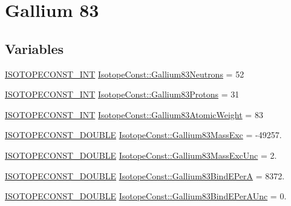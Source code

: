 \hypertarget{group___isotope_const-_gallium-_ga83}{}\section{Gallium 83}
\label{group___isotope_const-_gallium-_ga83}
\subsection*{Variables}
\begin{DoxyCompactItemize}
\item 
\mbox{\hyperlink{group___isotope_const-_macros_ga5f18360b3e99483a35c32d789e62621c}{I\+S\+O\+T\+O\+P\+E\+C\+O\+N\+S\+T\+\_\+\+I\+NT}} \mbox{\hyperlink{group___isotope_const-_gallium-_ga83_ga696f2ad19556b86b7cd582b1426db082}{Isotope\+Const\+::\+Gallium83\+Neutrons}} = 52
\item 
\mbox{\hyperlink{group___isotope_const-_macros_ga5f18360b3e99483a35c32d789e62621c}{I\+S\+O\+T\+O\+P\+E\+C\+O\+N\+S\+T\+\_\+\+I\+NT}} \mbox{\hyperlink{group___isotope_const-_gallium-_ga83_ga320ede1507cb8974cc3517ce604dbc89}{Isotope\+Const\+::\+Gallium83\+Protons}} = 31
\item 
\mbox{\hyperlink{group___isotope_const-_macros_ga5f18360b3e99483a35c32d789e62621c}{I\+S\+O\+T\+O\+P\+E\+C\+O\+N\+S\+T\+\_\+\+I\+NT}} \mbox{\hyperlink{group___isotope_const-_gallium-_ga83_gadae8c0547a0573df6a41caf8f7a9fee8}{Isotope\+Const\+::\+Gallium83\+Atomic\+Weight}} = 83
\item 
\mbox{\hyperlink{group___isotope_const-_macros_ga8f45a7272ce02c0b4c65c44636ed719a}{I\+S\+O\+T\+O\+P\+E\+C\+O\+N\+S\+T\+\_\+\+D\+O\+U\+B\+LE}} \mbox{\hyperlink{group___isotope_const-_gallium-_ga83_gabb8a637eeac85a47fb3b9ad7ef322934}{Isotope\+Const\+::\+Gallium83\+Mass\+Exc}} = -\/49257.
\item 
\mbox{\hyperlink{group___isotope_const-_macros_ga8f45a7272ce02c0b4c65c44636ed719a}{I\+S\+O\+T\+O\+P\+E\+C\+O\+N\+S\+T\+\_\+\+D\+O\+U\+B\+LE}} \mbox{\hyperlink{group___isotope_const-_gallium-_ga83_ga59e770236fc9253fd94c1864504096cb}{Isotope\+Const\+::\+Gallium83\+Mass\+Exc\+Unc}} = 2.
\item 
\mbox{\hyperlink{group___isotope_const-_macros_ga8f45a7272ce02c0b4c65c44636ed719a}{I\+S\+O\+T\+O\+P\+E\+C\+O\+N\+S\+T\+\_\+\+D\+O\+U\+B\+LE}} \mbox{\hyperlink{group___isotope_const-_gallium-_ga83_ga865e16badc79553e20939d57bc2a23bc}{Isotope\+Const\+::\+Gallium83\+Bind\+E\+PerA}} = 8372.
\item 
\mbox{\hyperlink{group___isotope_const-_macros_ga8f45a7272ce02c0b4c65c44636ed719a}{I\+S\+O\+T\+O\+P\+E\+C\+O\+N\+S\+T\+\_\+\+D\+O\+U\+B\+LE}} \mbox{\hyperlink{group___isotope_const-_gallium-_ga83_ga92ec9a157fc39ffe2dbe8469826a6bba}{Isotope\+Const\+::\+Gallium83\+Bind\+E\+Per\+A\+Unc}} = 0.

\end{DoxyCompactItemize}
